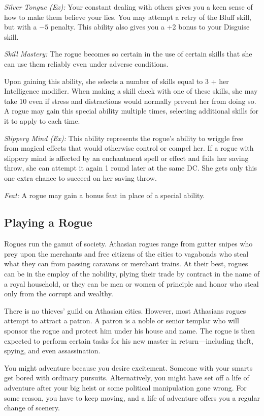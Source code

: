 \textit{Silver Tongue (Ex):} Your constant dealing with others gives you a keen sense of how to make them believe your lies. You may attempt a retry of the Bluff skill, but with a $-5$ penalty. This ability also gives you a +2 bonus to your Disguise skill.

\textit{Skill Mastery:} The rogue becomes so certain in the use of certain skills that she can use them reliably even under adverse conditions.

Upon gaining this ability, she selects a number of skills equal to 3 + her Intelligence modifier. When making a skill check with one of these skills, she may take 10 even if stress and distractions would normally prevent her from doing so. A rogue may gain this special ability multiple times, selecting additional skills for it to apply to each time.

\textit{Slippery Mind (Ex):} This ability represents the rogue's ability to wriggle free from magical effects that would otherwise control or compel her. If a rogue with slippery mind is affected by an enchantment spell or effect and fails her saving throw, she can attempt it again 1 round later at the same DC. She gets only this one extra chance to succeed on her saving throw.

\textit{Feat:} A rogue may gain a bonus feat in place of a special ability.

\subsection{Playing a Rogue}

Rogues run the gamut of society. Athasian rogues range from gutter snipes who prey upon the merchants and free citizens of the cities to vagabonds who steal what they can from passing caravans or merchant trains. At their best, rogues can be in the employ of the nobility, plying their trade by contract in the name of a royal household, or they can be men or women of principle and honor who steal only from the corrupt and wealthy.

There is no thieves' guild on Athasian cities. However, most Athasians rogues attempt to attract a patron. A patron is a noble or senior templar who will sponsor the rogue and protect him under his house and name. The rogue is then expected to perform certain tasks for his new master in return—including theft, spying, and even assassination.

You might adventure because you desire excitement. Someone with your smarts get bored with ordinary pursuits. Alternatively, you might have set off a life of adventure after your big heist or some political manipulation gone wrong. For some reason, you have to keep moving, and a life of adventure offers you a regular change of scenery.

